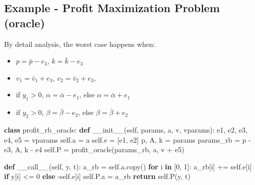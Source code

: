 \documentclass[
]{article}
\newenvironment{Shaded}{}{}
\newcommand{\ControlFlowTok}[1]{\textcolor[rgb]{0.00,0.44,0.13}{\textbf{#1}}}
\newcommand{\DecValTok}[1]{\textcolor[rgb]{0.25,0.63,0.44}{#1}}
\newcommand{\FunctionTok}[1]{\textcolor[rgb]{0.02,0.16,0.49}{#1}}
\newcommand{\KeywordTok}[1]{\textcolor[rgb]{0.00,0.44,0.13}{\textbf{#1}}}
\newcommand{\NormalTok}[1]{#1}
\newcommand{\OperatorTok}[1]{\textcolor[rgb]{0.40,0.40,0.40}{#1}}
\newcommand{\VariableTok}[1]{\textcolor[rgb]{0.10,0.09,0.49}{#1}}
\providecommand{\tightlist}{%
  \setlength{\itemsep}{0pt}\setlength{\parskip}{0pt}}
\begin{document}
\hypertarget{example---profit-maximization-problem-oracle}{%
\subsection{Example - Profit Maximization Problem (oracle)}\label{example---profit-maximization-problem-oracle}}

By detail analysis, the worst case happens when:

\begin{itemize}
\tightlist
\item
  \(p = \bar{p} - e_3\), \(k = \bar{k} - e_3\)
\item
  \(v_1 = \bar{v}_1 + e_3\), \(v_2 = \bar{v}_2 + e_3\),
\item
  if \(y_1 > 0\), \(\alpha = \bar{\alpha} - e_1\), else
  \(\alpha = \bar{\alpha} + e_1\)
\item
  if \(y_2 > 0\), \(\beta = \bar{\beta} - e_2\), else
  \(\beta = \bar{\beta} + e_2\)
\end{itemize}

\begin{Shaded}
\begin{Highlighting}[]
\KeywordTok{class}\NormalTok{ profit\_rb\_oracle:}
    \KeywordTok{def} \FunctionTok{\_\_init\_\_}\NormalTok{(}\VariableTok{self}\NormalTok{, params, a, v, vparams):}
\NormalTok{        e1, e2, e3, e4, e5 }\OperatorTok{=}\NormalTok{ vparams}
        \VariableTok{self}\NormalTok{.a }\OperatorTok{=}\NormalTok{ a}
        \VariableTok{self}\NormalTok{.e }\OperatorTok{=}\NormalTok{ [e1, e2]}
\NormalTok{        p, A, k }\OperatorTok{=}\NormalTok{ params}
\NormalTok{        params\_rb }\OperatorTok{=}\NormalTok{ p }\OperatorTok{{-}}\NormalTok{ e3, A, k }\OperatorTok{{-}}\NormalTok{ e4}
        \VariableTok{self}\NormalTok{.P }\OperatorTok{=}\NormalTok{ profit\_oracle(params\_rb, a, v }\OperatorTok{+}\NormalTok{ e5)}

    \KeywordTok{def} \FunctionTok{\_\_call\_\_}\NormalTok{(}\VariableTok{self}\NormalTok{, y, t):}
\NormalTok{        a\_rb }\OperatorTok{=} \VariableTok{self}\NormalTok{.a.copy()}
        \ControlFlowTok{for}\NormalTok{ i }\KeywordTok{in}\NormalTok{ [}\DecValTok{0}\NormalTok{, }\DecValTok{1}\NormalTok{]:}
\NormalTok{            a\_rb[i] }\OperatorTok{+=} \VariableTok{self}\NormalTok{.e[i] }\ControlFlowTok{if}\NormalTok{ y[i] }\OperatorTok{\textless{}=} \DecValTok{0} \ControlFlowTok{else} \OperatorTok{{-}}\VariableTok{self}\NormalTok{.e[i]}
        \VariableTok{self}\NormalTok{.P.a }\OperatorTok{=}\NormalTok{ a\_rb}
        \ControlFlowTok{return} \VariableTok{self}\NormalTok{.P(y, t)}
\end{Highlighting}
\end{Shaded}
\end{document}
